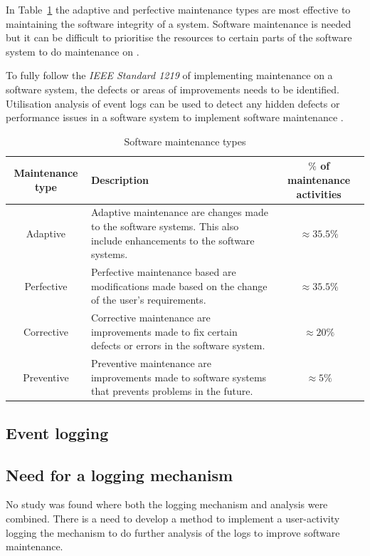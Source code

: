 In Table~\ref{tbl:CH1_MaintenanceTypes} the adaptive and perfective maintenance types are most effective to maintaining the software integrity of a system. Software maintenance is needed but it can be difficult to prioritise the resources to certain parts of the software system to do maintenance on \cite{Mamone1994,Hasan2012}.\par To fully follow the \textit{IEEE Standard 1219} of implementing maintenance on a software system, the defects or areas of improvements needs to be identified. Utilisation analysis of event logs can be used to detect any hidden defects or performance issues in a software system to implement software maintenance \cite{Cinque2013,Rong2018a}.

\clearpage

\begin{table}[!htb]
    \centering
    \small
    \caption{Software maintenance types}
    \label{tbl:CH1_MaintenanceTypes}
    \begin{tabularx}{\textwidth}{|c|X|c|}
        \hline
        Maintenance type & Description & $\%$ of maintenance activities \\ \hline
        Adaptive & \raggedright Adaptive maintenance are changes made to the software systems. This also include enhancements to the software systems. & $\approx 35.5\%$ \\ \hline
        Perfective & Perfective maintenance based are modifications made based on the change of the user's requirements. & $\approx 35.5\%$ \\ \hline
        Corrective & \raggedright Corrective maintenance are improvements made to fix certain defects or errors in the software system. & $\approx 20\%$ \\ \hline
        Preventive & \raggedright  Preventive maintenance are improvements made to software systems that prevents problems in the future. & $\approx 5\%$ \\ \hline
    \end{tabularx}
\end{table}

\subsection{Event logging}

\subsection{Need for a logging mechanism}
No study was found where both the logging mechanism and analysis were combined.
There is a need to develop a method to implement a user-activity logging
the mechanism to do further analysis of the logs to improve software
maintenance.

